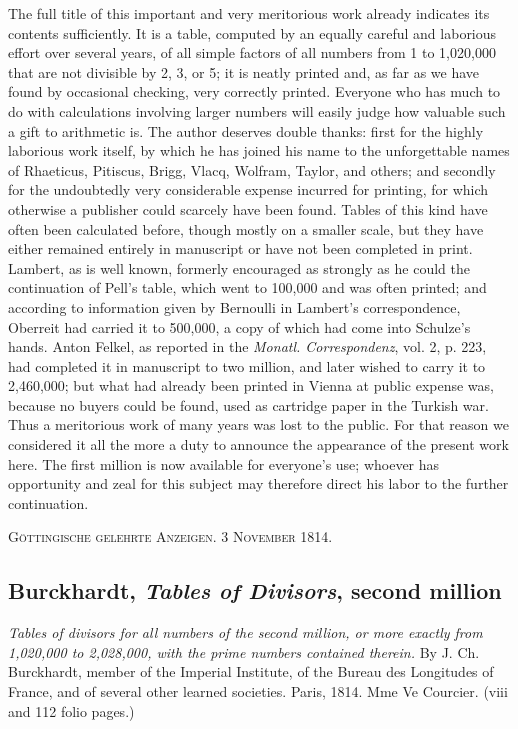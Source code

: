 \documentclass[12pt]{article}
\begin{document}
The full title of this important and very meritorious work already indicates its contents sufficiently. It is a table, computed by an equally careful and laborious effort over several years, of all simple factors of all numbers from 1 to 1,020,000 that are not divisible by 2, 3, or 5; it is neatly printed and, as far as we have found by occasional checking, very correctly printed. Everyone who has much to do with calculations involving larger numbers will easily judge how valuable such a gift to arithmetic is. The author deserves double thanks: first for the highly laborious work itself, by which he has joined his name to the unforgettable names of Rhaeticus, Pitiscus, Brigg, Vlacq, Wolfram, Taylor, and others; and secondly for the undoubtedly very considerable expense incurred for printing, for which otherwise a publisher could scarcely have been found. Tables of this kind have often been calculated before, though mostly on a smaller scale, but they have either remained entirely in manuscript or have not been completed in print. Lambert, as is well known, formerly encouraged as strongly as he could the continuation of Pell's table, which went to 100,000 and was often printed; and according to information given by Bernoulli in Lambert's correspondence, Oberreit had carried it to 500,000, a copy of which had come into Schulze's hands. Anton Felkel, as reported in the \textit{Monatl. Correspondenz}, vol. 2, p. 223, had completed it in manuscript to two million, and later wished to carry it to 2,460,000; but what had already been printed in Vienna at public expense was, because no buyers could be found, used as cartridge paper in the Turkish war. Thus a meritorious work of many years was lost to the public. For that reason we considered it all the more a duty to announce the appearance of the present work here. The first million is now available for everyone's use; whoever has opportunity and zeal for this subject may therefore direct his labor to the further continuation.

\begin{center}
\textsc{Göttingische gelehrte Anzeigen. 3 November 1814.}
\end{center}

\subsection*{Burckhardt, \textit{Tables of Divisors}, second million}

\begin{center}
\textit{Tables of divisors for all numbers of the second million, or more exactly from 1,020,000 to 2,028,000, with the prime numbers contained therein.} By J. Ch. Burckhardt, member of the Imperial Institute, of the Bureau des Longitudes of France, and of several other learned societies. Paris, 1814. Mme Ve Courcier. (viii and 112 folio pages.)
\end{center}
\end{document}
